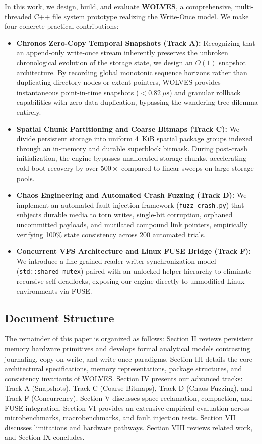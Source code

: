 \documentclass[conference]{IEEEtran}
\begin{document}
In this work, we design, build, and evaluate \textbf{WOLVES}, a comprehensive, multi-threaded C++ file system prototype realizing the Write-Once model. We make four concrete practical contributions:
\begin{itemize}
    \item \textbf{Chronos Zero-Copy Temporal Snapshots (Track A):} Recognizing that an append-only write-once stream inherently preserves the unbroken chronological evolution of the storage state, we design an $O(1)$ snapshot architecture. By recording global monotonic sequence horizons rather than duplicating directory nodes or extent pointers, WOLVES provides instantaneous point-in-time snapshots ($<0.82~\mu\text{s}$) and granular rollback capabilities with zero data duplication, bypassing the wandering tree dilemma entirely.
    \item \textbf{Spatial Chunk Partitioning and Coarse Bitmaps (Track C):} We divide persistent storage into uniform 4~KiB spatial package groups indexed through an in-memory and durable superblock bitmask. During post-crash initialization, the engine bypasses unallocated storage chunks, accelerating cold-boot recovery by over $500\times$ compared to linear sweeps on large storage pools.
    \item \textbf{Chaos Engineering and Automated Crash Fuzzing (Track D):} We implement an automated fault-injection framework (\texttt{fuzz\_crash.py}) that subjects durable media to torn writes, single-bit corruption, orphaned uncommitted payloads, and mutilated compound link pointers, empirically verifying 100\% state consistency across 200 automated trials.
    \item \textbf{Concurrent VFS Architecture and Linux FUSE Bridge (Track F):} We introduce a fine-grained reader-writer synchronization model (\texttt{std::shared\_mutex}) paired with an unlocked helper hierarchy to eliminate recursive self-deadlocks, exposing our engine directly to unmodified Linux environments via FUSE.
\end{itemize}

\subsection{Document Structure}
The remainder of this paper is organized as follows: Section II reviews persistent memory hardware primitives and develops formal analytical models contrasting journaling, copy-on-write, and write-once paradigms. Section III details the core architectural specifications, memory representations, package structures, and consistency invariants of WOLVES. Section IV presents our advanced tracks: Track A (Snapshots), Track C (Coarse Bitmaps), Track D (Chaos Fuzzing), and Track F (Concurrency). Section V discusses space reclamation, compaction, and FUSE integration. Section VI provides an extensive empirical evaluation across microbenchmarks, macrobenchmarks, and fault injection tests. Section VII discusses limitations and hardware pathways. Section VIII reviews related work, and Section IX concludes.
\end{document}
